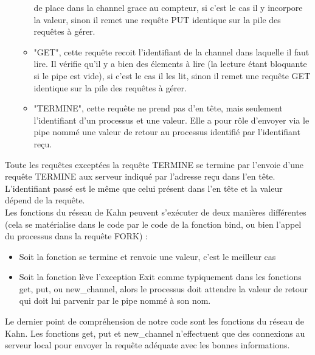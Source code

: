 \documentclass[a4paper, 12pt, twoside]{report}
\begin{document}
\begin{itemize}
\begin{itemize}
                de place dans la channel grace au compteur, si c'est le cas il y incorpore la valeur, sinon il remet une requête 
                PUT identique sur la pile des requêtes à gérer.
          \item "GET", cette requête recoit l'identifiant de la channel dans laquelle il faut lire. Il vérifie qu'il y a bien 
                des élements à lire (la lecture étant bloquante si le pipe est vide), si c'est le cas il les lit, sinon 
                il remet une requête GET identique sur la pile des requêtes à gérer.
          \item "TERMINE", cette requête ne prend pas d'en tête, mais seulement l'identifiant d'un processus et une valeur. 
                Elle a pour rôle d'envoyer via le pipe nommé une valeur de retour au processus identifié par l'identifiant reçu.\\
        \end{itemize}
\end{itemize}

Toute les requêtes exceptées la requête TERMINE se termine par l'envoie d'une requête TERMINE aux serveur indiqué par l'adresse 
reçu dans l'en tête. L'identifiant passé est le même que celui présent dans l'en tête et la valeur dépend de la requête.\\

Les fonctions du réseau de Kahn peuvent s'exécuter de deux manières différentes (cela se matérialise dans le code par le code 
de la fonction bind, ou bien l'appel du processus dans la requête FORK) :
\begin{itemize}
  \item Soit la fonction se termine et renvoie une valeur, c'est le meilleur cas
  \item Soit la fonction lève l'exception Exit comme typiquement dans les fonctions get, put, ou new_channel, alors 
        le processus doit attendre la valeur de retour qui doit lui parvenir par le pipe nommé à son nom.\\
\end{itemize}

Le dernier point de compréhension de notre code sont les fonctions du réseau de Kahn. Les fonctions get, put et new_channel 
n'effectuent que des connexions au serveur local pour envoyer la requête adéquate avec les bonnes informations.
\end{document}
